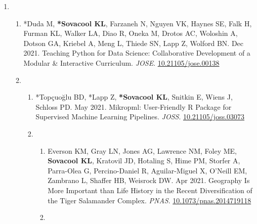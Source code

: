 \documentclass[12pt,a4paper,]{moderncv}
\providecommand{\tightlist}{%
	\setlength{\itemsep}{0pt}\setlength{\parskip}{0pt}}
\begin{document}
\begin{enumerate}
\begin{enumerate}
\begin{enumerate}
\begin{enumerate}
        \item

        \begin{enumerate}
        \def\labelenumv{\arabic{enumv}.}
        \tightlist
        \item
          *Duda M, \textbf{*Sovacool KL}, Farzaneh N, Nguyen VK, Haynes
          SE, Falk H, Furman KL, Walker LA, Diao R, Oneka M, Drotos AC,
          Woloshin A, Dotson GA, Kriebel A, Meng L, Thiede SN, Lapp Z,
          Wolford BN. Dec 2021. Teaching Python for Data Science:
          Collaborative Development of a Modular \& Interactive
          Curriculum. \emph{JOSE}.
          \href{https://doi.org/10.21105/jose.00138}{10.21105/jose.00138}
          \newline  

          \item

          \begin{enumerate}
          \def\labelenumvi{\arabic{enumvi}.}
          \tightlist
          \item
            *Topçuoğlu BD, *Lapp Z, \textbf{*Sovacool KL}, Snitkin E,
            Wiens J, Schloss PD. May 2021. Mikropml: User-Friendly R
            Package for Supervised Machine Learning Pipelines.
            \emph{JOSS}.
            \href{https://doi.org/10.21105/joss.03073}{10.21105/joss.03073}
            \newline  

            \item

            \begin{enumerate}
            \def\labelenumvii{\arabic{enumvii}.}
            \tightlist
            \item
              Everson KM, Gray LN, Jones AG, Lawrence NM, Foley ME,
              \textbf{Sovacool KL}, Kratovil JD, Hotaling S, Hime PM,
              Storfer A, Parra-Olea G, Percino-Daniel R, Aguilar-Miguel
              X, O'Neill EM, Zambrano L, Shaffer HB, Weisrock DW. Apr
              2021. Geography Is More Important than Life History in the
              Recent Diversification of the Tiger Salamander Complex.
              \emph{PNAS}.
              \href{https://doi.org/10.1073/pnas.2014719118}{10.1073/pnas.2014719118}
              \newline  

              \item


\end{enumerate}
\end{enumerate}
\end{enumerate}
\end{enumerate}
\end{enumerate}
\end{enumerate}
\end{enumerate}
\end{document}
